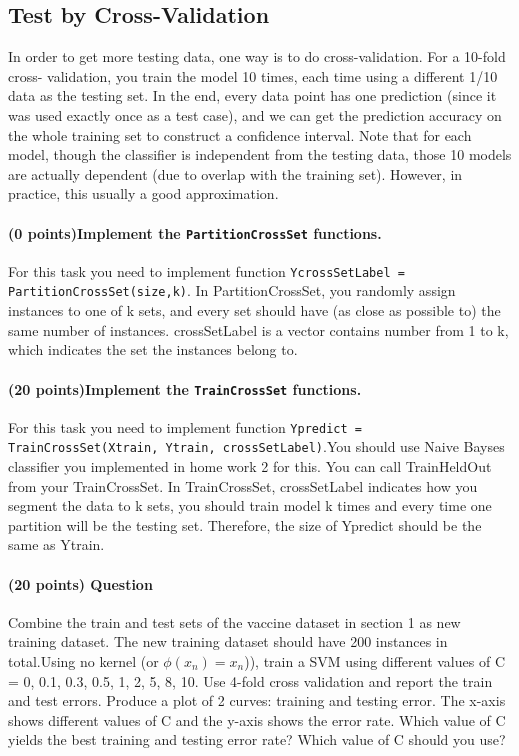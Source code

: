 \documentclass[11pt]{article}
\begin{document}
\subsection{Test by Cross-Validation}
In order to get more testing data, one way is to do cross-validation. For a 10-fold cross- validation, you train the model 10 times, each time using a different 1/10 data as the testing
set. In the end, every data point has one prediction (since it was used exactly once as a test case), and we can get the prediction accuracy on the whole training set to construct a confidence interval.
Note that for each model, though the classifier is independent from the testing data, those 10 models are actually dependent (due to overlap with the training set). However, in practice, this usually a good approximation.

\paragraph {(0 points)Implement the  \texttt{PartitionCrossSet} functions.} For this task you need to implement function   \texttt{YcrossSetLabel = PartitionCrossSet(size,k)}.
In PartitionCrossSet, you randomly assign instances to one of k sets, and every set should have (as close as possible to) the same number of instances. crossSetLabel is a vector contains number from 1 to k, which indicates the set the instances belong to.

\paragraph {(20 points)Implement the  \texttt{TrainCrossSet} functions.} For this task you need to implement function   \texttt{Ypredict = TrainCrossSet(Xtrain, Ytrain, crossSetLabel)}.You should use Naive Bayses classifier you implemented in home work 2 for this. You can call TrainHeldOut from your TrainCrossSet. In TrainCrossSet, crossSetLabel indicates how you segment the data to k sets, you should train model k times and every time one partition will be the testing set. Therefore, the size of Ypredict should be the same as Ytrain.

\paragraph{(20 points) Question} Combine the train and test sets of the vaccine dataset in section 1 as new training dataset. The new training dataset should have 200 instances in total.Using no kernel (or $\phi $$(x_n) = x_n$)), train a SVM using different values of C = 0, 0.1, 0.3, 0.5, 1, 2, 5, 8, 10. Use 4-fold cross validation and report the train and test errors. Produce a plot of 2 curves: training and testing error. The x-axis shows different values of C and the y-axis shows the error rate. \newline
Which value of C yields the best training and testing error rate? Which value of C should you use?
\end{document}
